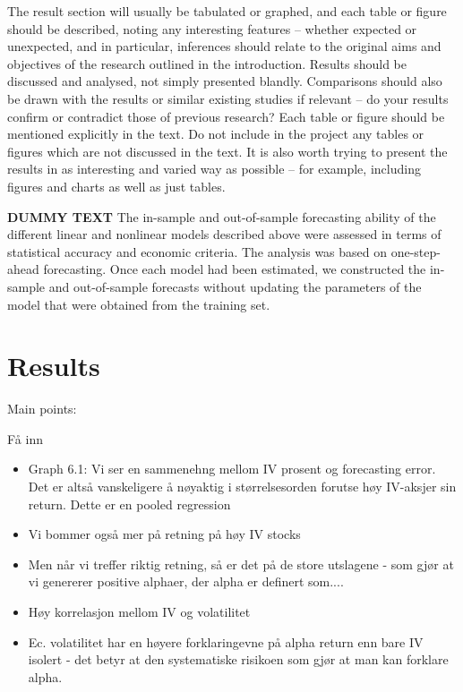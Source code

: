 The result section will usually be tabulated or graphed, and each table or figure should be described, noting any interesting features – whether expected or unexpected, and in particular, inferences should relate to the original aims and objectives of the research outlined in the introduction. Results should be discussed and analysed, not simply presented blandly. Comparisons should also be drawn with the results or similar existing studies if relevant – do your results confirm or contradict those of previous research? Each table or figure should be mentioned explicitly in the text. Do not include in the project any tables or figures which are not discussed in the text. It is also worth trying to present the results in as interesting and varied way as possible – for example, including figures and charts as well as just tables.

\textbf{DUMMY TEXT}
The in-sample and out-of-sample forecasting ability of the different linear and nonlinear models described above were assessed in terms of statistical accuracy and economic criteria. The analysis was based on one-step-ahead forecasting. Once each model had been estimated, we constructed the in-sample and out-of-sample forecasts without updating the parameters of the model that were
obtained from the training set.

\chapter{Results}

Main points:

Få inn 
\begin{itemize}
    \item Graph 6.1: Vi ser en sammenehng mellom IV prosent og forecasting error. Det er altså vanskeligere å nøyaktig i størrelsesorden forutse høy IV-aksjer sin return. Dette er en pooled regression
    \item Vi bommer også mer på retning på høy IV stocks
    \item Men når vi treffer riktig retning, så er det på de store utslagene - som gjør at vi genererer positive alphaer, der alpha er definert som....
    \item Høy korrelasjon mellom IV og volatilitet 
    \item Ec. volatilitet har en høyere forklaringevne på alpha return enn bare IV isolert - det betyr at den systematiske risikoen som gjør at man kan forklare alpha.
\end{itemize}

